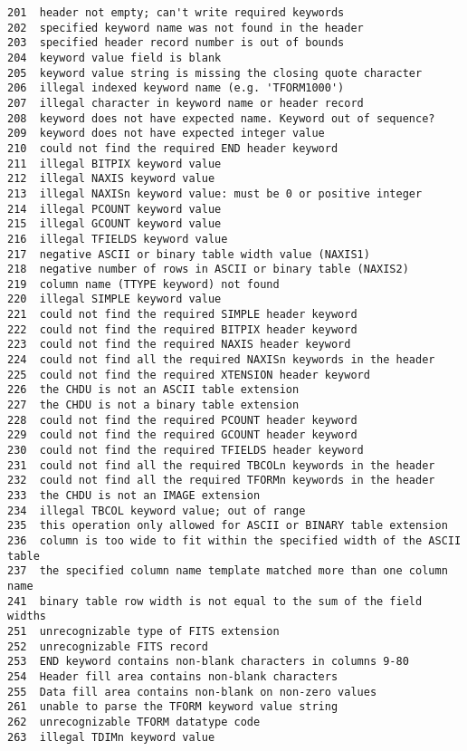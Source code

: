 \documentclass[11pt]{book}
\begin{document}
\begin{verbatim}
201  header not empty; can't write required keywords
202  specified keyword name was not found in the header
203  specified header record number is out of bounds
204  keyword value field is blank
205  keyword value string is missing the closing quote character
206  illegal indexed keyword name (e.g. 'TFORM1000')
207  illegal character in keyword name or header record
208  keyword does not have expected name. Keyword out of sequence?
209  keyword does not have expected integer value
210  could not find the required END header keyword
211  illegal BITPIX keyword value
212  illegal NAXIS keyword value
213  illegal NAXISn keyword value: must be 0 or positive integer
214  illegal PCOUNT keyword value
215  illegal GCOUNT keyword value
216  illegal TFIELDS keyword value
217  negative ASCII or binary table width value (NAXIS1)
218  negative number of rows in ASCII or binary table (NAXIS2)
219  column name (TTYPE keyword) not found
220  illegal SIMPLE keyword value
221  could not find the required SIMPLE header keyword
222  could not find the required BITPIX header keyword
223  could not find the required NAXIS header keyword
224  could not find all the required NAXISn keywords in the header
225  could not find the required XTENSION header keyword
226  the CHDU is not an ASCII table extension
227  the CHDU is not a binary table extension
228  could not find the required PCOUNT header keyword
229  could not find the required GCOUNT header keyword
230  could not find the required TFIELDS header keyword
231  could not find all the required TBCOLn keywords in the header
232  could not find all the required TFORMn keywords in the header
233  the CHDU is not an IMAGE extension
234  illegal TBCOL keyword value; out of range
235  this operation only allowed for ASCII or BINARY table extension
236  column is too wide to fit within the specified width of the ASCII table
237  the specified column name template matched more than one column name
241  binary table row width is not equal to the sum of the field widths
251  unrecognizable type of FITS extension
252  unrecognizable FITS record
253  END keyword contains non-blank characters in columns 9-80
254  Header fill area contains non-blank characters
255  Data fill area contains non-blank on non-zero values
261  unable to parse the TFORM keyword value string
262  unrecognizable TFORM datatype code
263  illegal TDIMn keyword value


\end{verbatim}
\end{document}
